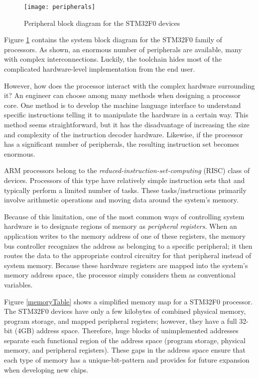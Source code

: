 \documentclass[openany,11pt,fleqn]{book} %
\begin{document}
\begin{figure}[]
    \centering\texttt{[image: peripherals]}
    \caption{Peripheral block diagram for the STM32F0 devices}
    \label{peripherals}
\end{figure}

Figure \ref{peripherals} contains the system block diagram for the STM32F0 family of processors. As shown, an enormous number of peripherals are available, many with complex interconnections. Luckily, the toolchain hides most of the complicated hardware-level implementation from the end user.

However, how does the processor interact with the complex hardware surrounding it? An engineer can choose among many methods when designing a processor core. One method is to develop the machine language interface to understand specific instructions telling it to manipulate the hardware in a certain way. This method seems straightforward, but it has the disadvantage of increasing the size and complexity of the instruction decoder hardware. Likewise, if the processor has a significant number of peripherals, the resulting instruction set becomes enormous. 

ARM processors belong to the \textit{reduced-instruction-set-computing} (RISC) class of devices. Processors of this type have relatively simple instruction sets that and typically perform a limited number of tasks. These tasks/instructions primarily involve arithmetic operations and moving data around the system's memory.

Because of this limitation, one of the most common ways of controlling system hardware is to designate regions of memory as \textit{peripheral registers}. When an application writes to the memory address of one of these registers, the memory bus controller recognizes the address as belonging to a specific peripheral; it then routes the data to the appropriate control circuitry for that peripheral instead of system memory. Because these hardware registers are mapped into the system's memory address space, the processor simply considers them as conventional variables. 

Figure \ref{memoryTable} shows a simplified memory map for a STM32F0 processor. The STM32F0 devices have only a few kilobytes of combined physical memory, program storage, and mapped peripheral registers; however, they have a full 32-bit (4GB) address space. Therefore, huge blocks of unimplemented addresses separate each functional region of the address space (program storage, physical memory, and peripheral registers). These gaps in the address space ensure that each type of memory has a unique-bit-pattern and provides for future expansion when developing new chips. 
\end{document}

